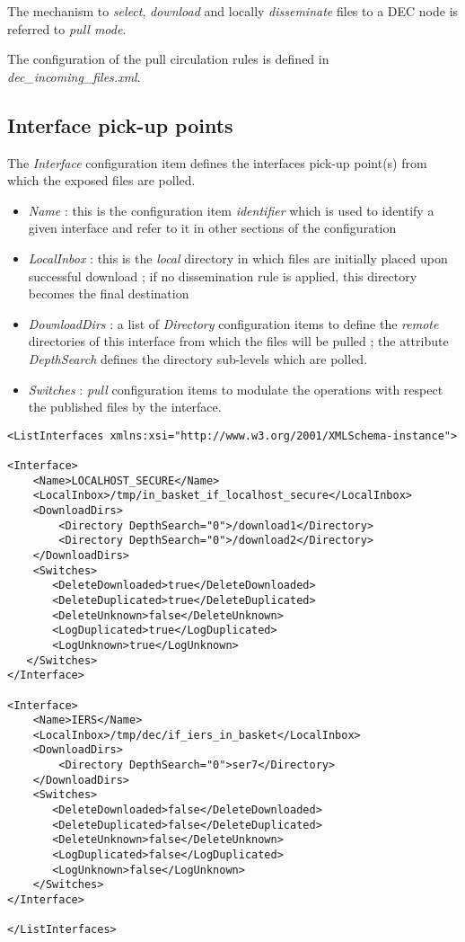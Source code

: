 \documentclass[dec_sum_main.tex]{subfiles}
\begin{document}
The mechanism to \textit{select}, \textit{download} and locally \textit{disseminate} files to a DEC node is referred to \textit{pull mode}.
\par
\noindent
The configuration of the pull circulation rules is defined in \textit{dec\_incoming\_files.xml}.

\subsection{Interface pick-up points}
The \textit{Interface} configuration item defines the interfaces pick-up point(s) from which the exposed files are polled.
\par
\noindent
\label{LocalInbox}
\label{DownloadDirs}
\begin{itemize}
	\item \textit{Name} : this is the configuration item \textit{identifier} which is used to identify a given interface and refer to it in other sections of the configuration
	\item \textit{LocalInbox} : this is the \textit{local} directory in which files are initially placed upon successful download ; if no dissemination rule is applied, this directory becomes the final destination  
	\item \textit{DownloadDirs} : a list of \textit{Directory} configuration items to define the \textit{remote} directories of this interface from which the files will be pulled ; the attribute \textit{DepthSearch} defines the directory sub-levels which are polled.
	\item \textit{Switches} : \textit{pull} configuration items to modulate the operations with respect the published files by the interface.
\end{itemize}


\begin{lstlisting}
<ListInterfaces xmlns:xsi="http://www.w3.org/2001/XMLSchema-instance">

<Interface>
	<Name>LOCALHOST_SECURE</Name>
	<LocalInbox>/tmp/in_basket_if_localhost_secure</LocalInbox>
	<DownloadDirs>
		<Directory DepthSearch="0">/download1</Directory>
		<Directory DepthSearch="0">/download2</Directory>
	</DownloadDirs>
    <Switches>
	   <DeleteDownloaded>true</DeleteDownloaded>
	   <DeleteDuplicated>true</DeleteDuplicated>
	   <DeleteUnknown>false</DeleteUnknown>
	   <LogDuplicated>true</LogDuplicated>
	   <LogUnknown>true</LogUnknown>
   </Switches>  
</Interface>
				
<Interface>
	<Name>IERS</Name>
	<LocalInbox>/tmp/dec/if_iers_in_basket</LocalInbox>
	<DownloadDirs>
		<Directory DepthSearch="0">ser7</Directory>
	</DownloadDirs>
    <Switches>
       <DeleteDownloaded>false</DeleteDownloaded>
       <DeleteDuplicated>false</DeleteDuplicated>
       <DeleteUnknown>false</DeleteUnknown>
       <LogDuplicated>false</LogDuplicated>
       <LogUnknown>false</LogUnknown>
    </Switches>  	
</Interface>
		
</ListInterfaces>
\end{lstlisting}
\end{document}
